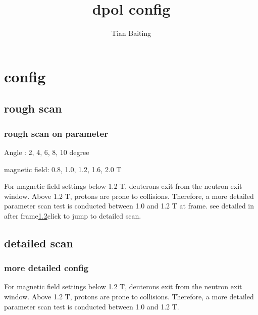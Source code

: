 \documentclass[aspectratio=169]{beamer}
\title{dpol config}
\author{Tian Baiting}
\institute{SAMURAI Collaboration}
\begin{document}
\begin{frame}
\titlepage
\end{frame}

\begin{frame}
\tableofcontents  
\end{frame}
\section{config}

\subsection{rough scan}

\begin{frame}
    \frametitle{rough scan on parameter}

Angle : 2, 4, 6, 8, 10 degree

magnetic field: 0.8, 1.0, 1.2, 1.6, 2.0 T

    
    For magnetic field settings below 1.2 T, deuterons exit from the neutron exit window. Above 1.2 T, protons are prone to collisions. Therefore, a more detailed parameter scan test is conducted between 1.0 and 1.2 T at frame. see detailed in after  frame\ref{detailed}{click to jump to detailed scan}.

\end{frame}



\subsection{detailed scan}\label{detailed}
\begin{frame}
    \frametitle{more detailed config}
    For magnetic field settings below 1.2 T, deuterons exit from the neutron exit window. Above 1.2 T, protons are prone to collisions. Therefore, a more detailed parameter scan test is conducted between 1.0 and 1.2 T.

\end{frame}


\end{document}
